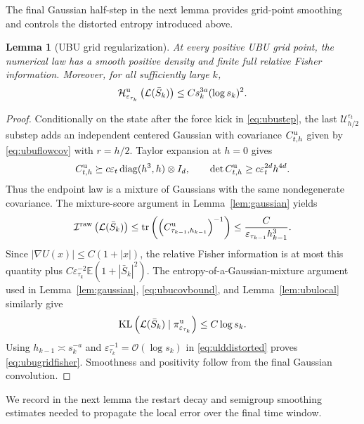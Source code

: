 \documentclass[11pt]{article}
\newtheorem{lemma}[theorem]{Lemma}
\theoremstyle{definition}
\newcommand{\E}{\mathbb E}
\newcommand{\KL}{\operatorname{KL}}
\newcommand{\Id}{I}
\newcommand{\cH}{\mathcal H}
\newcommand{\cI}{\mathcal I}
\newcommand{\eps}{\varepsilon}
\begin{document}
The final Gaussian half-step 
in the next lemma provides grid-point smoothing and controls the
distorted entropy introduced above.

\begin{lemma}[UBU grid regularization]\label{lem:ubugaussian}
At every positive UBU grid point, the numerical law has a smooth positive
density and finite full relative Fisher information. Moreover, for all
sufficiently large $k$,
\begin{equation}\label{eq:ubugridfisher}
 \cH^{\rm u}_{\eps_{\tau_k}}\left(\mathcal L(\bar S_k)\right)
 \leq Cs_k^{3a}(\log s_k)^2.
\end{equation}
\end{lemma}

\begin{proof}
Conditionally on the state after the force kick in \eqref{eq:ubustep}, the
last $\mathcal U_{h/2}^{\eps_t}$ substep adds an independent centered Gaussian
with covariance $C^{\rm u}_{t,h}$ given by \eqref{eq:ubuflowcov} with
$r=h/2$. Taylor expansion at $h=0$ gives
\begin{equation}\label{eq:ubucovbound}
 C^{\rm u}_{t,h}\succeq
 c\eps_t\operatorname{diag}(h^3,h)\otimes\Id_d,\qquad
 \det C^{\rm u}_{t,h}\geq c\eps_t^{2d}h^{4d}.
\end{equation}
Thus the endpoint law is a mixture of Gaussians with the same nondegenerate
covariance. The mixture-score argument in Lemma~\ref{lem:gaussian} yields
\[
 \cI^{\rm raw}\left(\mathcal L(\bar S_k)\right)
 \leq\operatorname{tr}\left(\left(C^{\rm u}_{\tau_{k-1},h_{k-1}}\right)^{-1}\right)
 \leq\frac{C}{\eps_{\tau_{k-1}}h_{k-1}^3}.
\]
Since $|\nabla U(x)|\leq C(1+|x|)$, the relative Fisher information is at
most this quantity plus
$C\eps_{\tau_k}^{-2}\E(1+|\bar S_k|^2)$. The entropy-of-a-Gaussian-mixture
argument used in Lemma~\ref{lem:gaussian}, \eqref{eq:ubucovbound}, and
Lemma~\ref{lem:ubulocal} similarly give
\[
 \KL\left(\mathcal L(\bar S_k)\mid\pi^{\rm u}_{\eps_{\tau_k}}\right)
 \leq C\log s_k.
\]
Using $h_{k-1}\asymp s_k^{-a}$ and
$\eps_{\tau_k}^{-1}=\mathcal{O}(\log s_k)$ in \eqref{eq:ulddistorted} proves
\eqref{eq:ubugridfisher}. Smoothness and positivity follow from the final
Gaussian convolution.
\end{proof}

We record in the next lemma the restart decay and semigroup smoothing estimates needed to
propagate the local error over the final time window.
\end{document}
